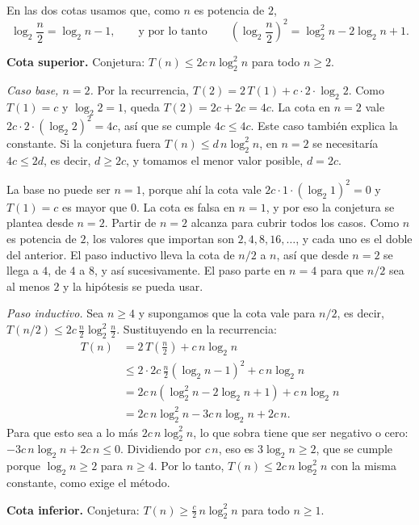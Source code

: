 En las dos cotas usamos que, como $n$ es potencia de $2$,
\[
  \log_2 \frac{n}{2} = \log_2 n - 1,
  \qquad \text{y por lo tanto} \qquad
  \left( \log_2 \frac{n}{2} \right)^2 = \log_2^2 n - 2\log_2 n + 1.
\]

\textbf{Cota superior.} Conjetura: $T(n) \le 2c\, n \log_2^2 n$ para todo $n \ge 2$.

\emph{Caso base, $n = 2$.} Por la recurrencia, $T(2) = 2\,T(1) + c \cdot 2 \cdot \log_2 2$.
Como $T(1) = c$ y $\log_2 2 = 1$, queda $T(2) = 2c + 2c = 4c$. La cota en $n = 2$ vale
$2c \cdot 2 \cdot (\log_2 2)^2 = 4c$, así que se cumple $4c \le 4c$. Este caso también
explica la constante. Si la conjetura fuera $T(n) \le d\, n\log_2^2 n$, en $n = 2$ se
necesitaría $4c \le 2d$, es decir, $d \ge 2c$, y tomamos el menor valor posible,
$d = 2c$.

La base no puede ser $n = 1$, porque ahí la cota vale $2c \cdot 1 \cdot (\log_2 1)^2 = 0$
y $T(1) = c$ es mayor que $0$. La cota es falsa en $n = 1$, y por eso la conjetura se
plantea desde $n = 2$. Partir de $n = 2$ alcanza para cubrir todos los casos. Como $n$ es
potencia de $2$, los valores que importan son $2, 4, 8, 16, \dots$, y cada uno es el doble
del anterior. El paso inductivo lleva la cota de $n/2$ a $n$, así que desde $n = 2$ se
llega a $4$, de $4$ a $8$, y así sucesivamente. El paso parte en $n = 4$ para que $n/2$
sea al menos $2$ y la hipótesis se pueda usar.

\emph{Paso inductivo.} Sea $n \ge 4$ y supongamos que la cota vale para $n/2$, es decir,
$T(n/2) \le 2c\, \frac{n}{2} \log_2^2 \frac{n}{2}$. Sustituyendo en la recurrencia:
\[
\begin{aligned}
  T(n) &= 2\,T\!\left(\frac{n}{2}\right) + c\,n\log_2 n \\
       &\le 2 \cdot 2c\, \frac{n}{2} \left(\log_2 n - 1\right)^2 + c\,n\log_2 n \\
       &= 2c\,n \left(\log_2^2 n - 2\log_2 n + 1\right) + c\,n\log_2 n \\
       &= 2c\,n\log_2^2 n - 3c\,n\log_2 n + 2c\,n.
\end{aligned}
\]
Para que esto sea a lo más $2c\,n\log_2^2 n$, lo que sobra tiene que ser negativo o cero:
$-3c\,n\log_2 n + 2c\,n \le 0$. Dividiendo por $c\,n$, eso es $3\log_2 n \ge 2$, que se
cumple porque $\log_2 n \ge 2$ para $n \ge 4$. Por lo tanto, $T(n) \le 2c\,n\log_2^2 n$
con la misma constante, como exige el método.

\textbf{Cota inferior.} Conjetura: $T(n) \ge \frac{c}{2}\, n \log_2^2 n$ para todo $n \ge 1$.

